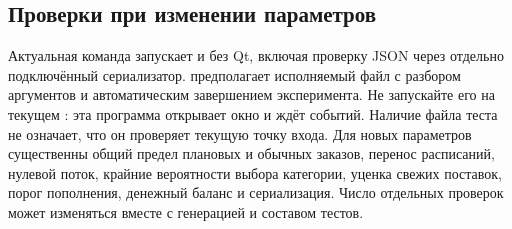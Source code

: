 \subsection{Проверки при изменении параметров}
Актуальная команда запускает  и 
без Qt, включая проверку JSON через отдельно подключённый сериализатор.
 предполагает исполняемый файл с разбором аргументов
и автоматическим завершением эксперимента. Не запускайте его на текущем
: эта программа открывает окно и ждёт событий.
Наличие файла теста не означает, что он проверяет текущую точку входа.
Для новых параметров существенны общий предел плановых и обычных заказов,
перенос расписаний, нулевой поток, крайние вероятности выбора категории,
уценка свежих поставок, порог пополнения, денежный баланс и сериализация.
Число отдельных проверок может изменяться вместе с генерацией и составом тестов.

